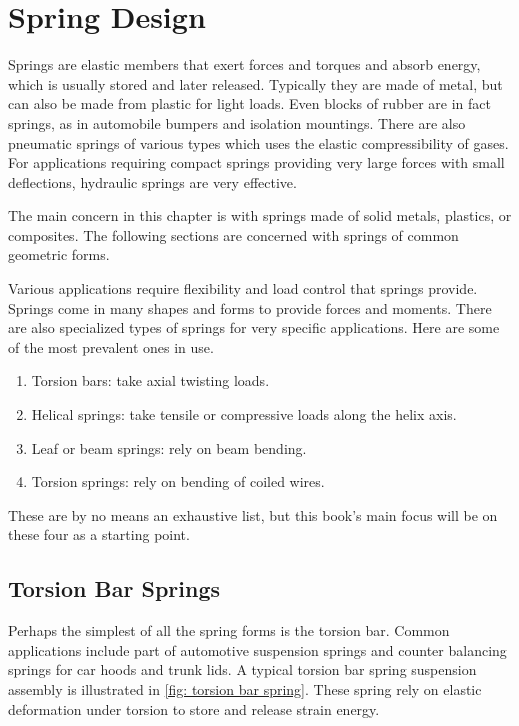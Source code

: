 \documentclass[
10pt,
a4paper,
openany,
svgnames,
]{book}
\begin{document}

\chapter{Spring Design}

Springs are elastic members that exert forces and torques and absorb energy, which is usually stored and later released. Typically they are made of metal, but can also be made from plastic for light loads. Even blocks of rubber are in fact springs, as in automobile bumpers and isolation mountings. There are also pneumatic springs of various types which uses the elastic compressibility of gases. For applications requiring compact springs providing very large forces with small deflections, hydraulic springs are very effective.

The main concern in this chapter is with springs made of solid metals, plastics, or composites. The following sections are concerned with springs of common geometric forms.

Various applications require flexibility and load control that springs provide. Springs come in many shapes and forms to provide forces and moments. There are also specialized types of springs for very specific applications. Here are some of the most prevalent ones in use.
\begin{enumerate}
\item Torsion bars: take axial twisting loads.
\item Helical springs: take tensile or compressive loads along the helix axis.
\item Leaf or beam springs: rely on beam bending.
\item Torsion springs: rely on bending of coiled wires.
\end{enumerate}
These are by no means an exhaustive list, but this book’s main focus will be on these four as a starting point.

\section{Torsion Bar Springs}

Perhaps the simplest of all the spring forms is the torsion bar. Common applications include part of automotive suspension springs and counter balancing springs for car hoods and trunk lids. A typical torsion bar spring suspension assembly is illustrated in \cref{fig: torsion bar spring}. These spring rely on elastic deformation under torsion to store and release strain energy.
\end{document}
